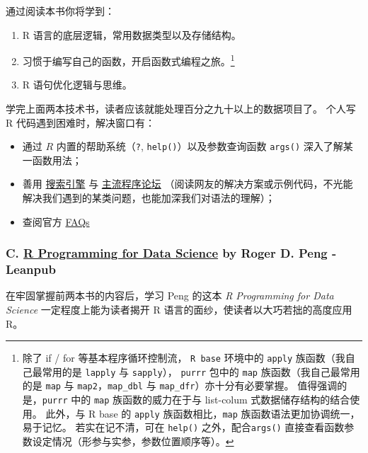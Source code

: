 \documentclass[11pt,hyperref]{ctexart}
\begin{document}
通过阅读本书你将学到：

\begin{enumerate}
\def\labelenumi{\arabic{enumi}.}
\item
  R 语言的底层逻辑，常用数据类型以及存储结构。
\item
  习惯于编写自己的函数，开启函数式编程之旅。\footnote{除了 if / for
    等基本程序循环控制流， \texttt{R\ base} 环境中的 \texttt{apply}
    族函数（我自己最常用的是 \texttt{lapply} 与 \texttt{sapply}），
    \texttt{purrr} 包中的 \texttt{map} 族函数（我自己最常用的是
    \texttt{map} 与 \texttt{map2}，\texttt{map\_dbl} 与
    \texttt{map\_dfr}）亦十分有必要掌握。 值得强调的是，\texttt{purrr}
    中的 \texttt{map} 族函数的威力在于与 list-colum
    式数据储存结构的结合使用。 此外，与 R base 的 \texttt{apply}
    族函数相比，\texttt{map} 族函数语法更加协调统一，易于记忆。
    若实在记不清，可在 \texttt{help()} 之外，配合\texttt{args()}
    直接查看函数参数设定情况（形参与实参，参数位置顺序等）。}
\item
  R 语句优化逻辑与思维。
\end{enumerate}

学完上面两本技术书，读者应该就能处理百分之九十以上的数据项目了。 个人写
R 代码遇到困难时，解决窗口有：

\begin{itemize}
\item
  通过 \(R\) 内置的帮助系统（\texttt{?},
  \texttt{help()}）以及参数查询函数 \texttt{args()}
  深入了解某一函数用法；
\item
  善用 \href{https://www.google.com/}{搜索引擎} 与
  \href{https://stackoverflow.com/questions/tagged/r}{主流程序论坛}
  （阅读网友的解决方案或示例代码，不光能解决我们遇到的某类问题，也能加深我们对语法的理解）；
\item
  查阅官方
  \href{https://mirrors.tuna.tsinghua.edu.cn/CRAN/faqs.html}{FAQs}
\end{itemize}

\hypertarget{c.-r-programming-for-data-science-by-roger-d.-peng---leanpub}{%
\subsubsection{\texorpdfstring{C.
\href{https://bookdown.org/rdpeng/rprogdatascience/}{R Programming for
Data Science} by Roger D. Peng -
Leanpub}{C. R Programming for Data Science by Roger D. Peng - Leanpub}}\label{c.-r-programming-for-data-science-by-roger-d.-peng---leanpub}}

在牢固掌握前两本书的内容后，学习 Peng 的这本 \emph{R Programming for
Data Science} 一定程度上能为读者揭开 R
语言的面纱，使读者以大巧若拙的高度应用 R。
\end{document}
